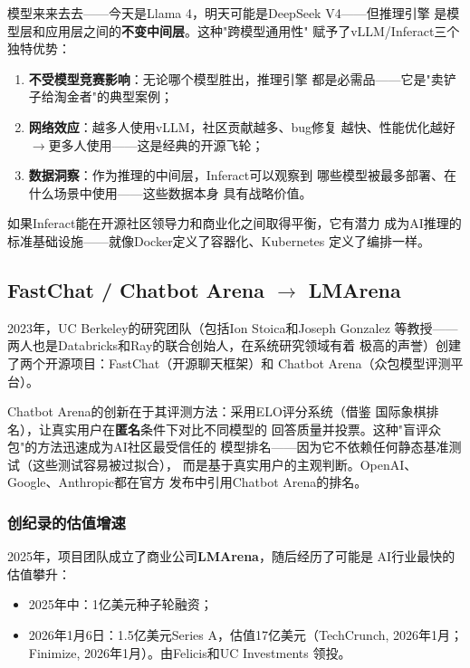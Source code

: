 \begin{whybox}
模型来来去去——今天是Llama 4，明天可能是DeepSeek V4——但推理引擎
是模型层和应用层之间的\textbf{不变中间层}。这种"跨模型通用性"
赋予了vLLM/Inferact三个独特优势：
\begin{enumerate}
  \item \textbf{不受模型竞赛影响}：无论哪个模型胜出，推理引擎
    都是必需品——它是"卖铲子给淘金者"的典型案例；
  \item \textbf{网络效应}：越多人使用vLLM，社区贡献越多、bug修复
    越快、性能优化越好$\to$更多人使用——这是经典的开源飞轮；
  \item \textbf{数据洞察}：作为推理的中间层，Inferact可以观察到
    哪些模型被最多部署、在什么场景中使用——这些数据本身
    具有战略价值。
\end{enumerate}
如果Inferact能在开源社区领导力和商业化之间取得平衡，它有潜力
成为AI推理的标准基础设施——就像Docker定义了容器化、Kubernetes
定义了编排一样。
\end{whybox}

\subsection{FastChat / Chatbot Arena $\to$ LMArena}
\label{subsec:lmarena}

2023年，UC Berkeley的研究团队（包括Ion Stoica和Joseph Gonzalez
等教授——两人也是Databricks和Ray的联合创始人，在系统研究领域有着
极高的声誉）创建了两个开源项目：FastChat（开源聊天框架）和
Chatbot Arena（众包模型评测平台）。

Chatbot Arena的创新在于其评测方法：采用ELO评分系统（借鉴
国际象棋排名），让真实用户在\textbf{匿名}条件下对比不同模型的
回答质量并投票。这种"盲评众包"的方法迅速成为AI社区最受信任的
模型排名——因为它不依赖任何静态基准测试（这些测试容易被过拟合），
而是基于真实用户的主观判断。OpenAI、Google、Anthropic都在官方
发布中引用Chatbot Arena的排名。

\subsubsection{创纪录的估值增速}
2025年，项目团队成立了商业公司\textbf{LMArena}，随后经历了可能是
AI行业最快的估值攀升：
\begin{itemize}
  \item 2025年中：1亿美元种子轮融资；
  \item 2026年1月6日：1.5亿美元Series A，估值17亿美元（TechCrunch,
    2026年1月；Finimize, 2026年1月）。由Felicis和UC Investments
    领投。
\end{itemize}

